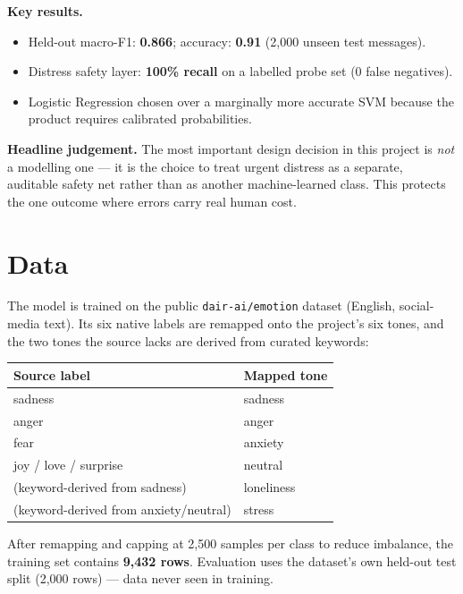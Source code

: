 \documentclass[11pt,a4paper]{article}
\begin{document}
\medskip
\noindent\textbf{Key results.}
\begin{itemize}[leftmargin=1.4em,itemsep=2pt]
  \item Held-out macro-F1: \textbf{0.866}; accuracy: \textbf{0.91} (2{,}000 unseen
        test messages).
  \item Distress safety layer: \textbf{100\% recall} on a labelled probe set
        (0 false negatives).
  \item Logistic Regression chosen over a marginally more accurate SVM because the
        product requires calibrated probabilities.
\end{itemize}

\medskip
\noindent\textbf{Headline judgement.} The most important design decision in this
project is \emph{not} a modelling one --- it is the choice to treat urgent distress
as a separate, auditable safety net rather than as another machine-learned class.
This protects the one outcome where errors carry real human cost.

\section{Data}
The model is trained on the public \texttt{dair-ai/emotion} dataset (English,
social-media text). Its six native labels are remapped onto the project's six
tones, and the two tones the source lacks are derived from curated keywords:

\begin{center}
\begin{tabular}{@{}ll@{}}
\toprule
\textbf{Source label} & \textbf{Mapped tone} \\
\midrule
sadness & sadness \\
anger & anger \\
fear & anxiety \\
joy / love / surprise & neutral \\
\midrule
(keyword-derived from sadness) & loneliness \\
(keyword-derived from anxiety/neutral) & stress \\
\bottomrule
\end{tabular}
\end{center}

\noindent After remapping and capping at 2{,}500 samples per class to reduce
imbalance, the training set contains \textbf{9{,}432 rows}. Evaluation uses the
dataset's own held-out test split (2{,}000 rows) --- data never seen in training.
\end{document}
